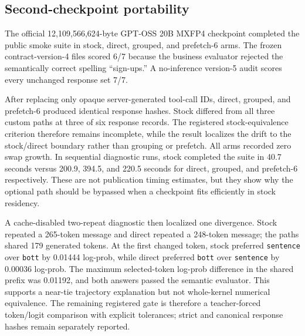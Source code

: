 \documentclass[10pt,twocolumn]{article}
\begin{document}
\subsection{Second-checkpoint portability}

The official 12,109,566,624-byte GPT-OSS 20B MXFP4 checkpoint completed the
public smoke suite in stock, direct, grouped, and prefetch-6 arms.  The frozen
contract-version-4 files scored 6/7 because the business evaluator rejected
the semantically correct spelling ``sign-ups.''  A no-inference version-5
audit scores every unchanged response set 7/7.

After replacing only opaque server-generated tool-call IDs, direct, grouped,
and prefetch-6 produced identical response hashes.  Stock differed from all
three custom paths at three of six response records.  The registered
stock-equivalence criterion therefore remains incomplete, while the result
localizes the drift to the stock/direct boundary rather than grouping or
prefetch.  All arms recorded zero swap growth.  In sequential diagnostic runs,
stock completed the suite in 40.7 seconds versus 200.9, 394.5, and 220.5
seconds for direct, grouped, and prefetch-6 respectively.  These are not
publication timing estimates, but they show why the optional path should be
bypassed when a checkpoint fits efficiently in stock residency.

A cache-disabled two-repeat diagnostic then localized one divergence.  Stock
repeated a 265-token message and direct repeated a 248-token message; the paths
shared 179 generated tokens.  At the first changed token, stock preferred
\texttt{sentence} over \texttt{bott} by 0.01444 log-prob, while direct preferred
\texttt{bott} over \texttt{sentence} by 0.00036 log-prob.  The maximum
selected-token log-prob difference in the shared prefix was 0.01192, and both
answers passed the semantic evaluator.  This supports a near-tie trajectory
explanation but not whole-kernel numerical equivalence.  The remaining
registered gate is therefore a teacher-forced token/logit comparison with
explicit tolerances; strict and canonical response hashes remain separately
reported.
\end{document}
